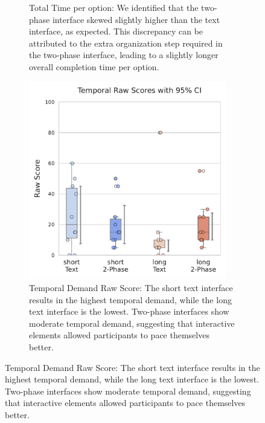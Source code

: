 \begin{figure}[h]
\begin{subfigure}[b]{0.52\textwidth}
        \captionsetup{width=\textwidth, justification=justified} %
        \caption{Total Time per option: We identified that the two-phase interface skewed slightly higher than the text interface, as expected. This discrepancy can be attributed to the extra organization step required in the two-phase interface, leading to a slightly longer overall completion time per option.}
        \label{fig:total_time}
    \end{subfigure}
    \hfill
    \begin{subfigure}[b]{0.38\textwidth}
        \centering
        \includegraphics[width=0.95\textwidth, trim=0 13 0 13, clip]{content/image/cog/Temporal_scores.pdf}
        \captionsetup{width=\textwidth, justification=justified} %
        \caption{Temporal Demand Raw Score: The short text interface results in the highest temporal demand, while the long text interface is the lowest. Two-phase interfaces show moderate temporal demand, suggesting that interactive elements allowed participants to pace themselves better.}
        \label{fig:temporal_cog_score}
    \end{subfigure}
\end{figure}

